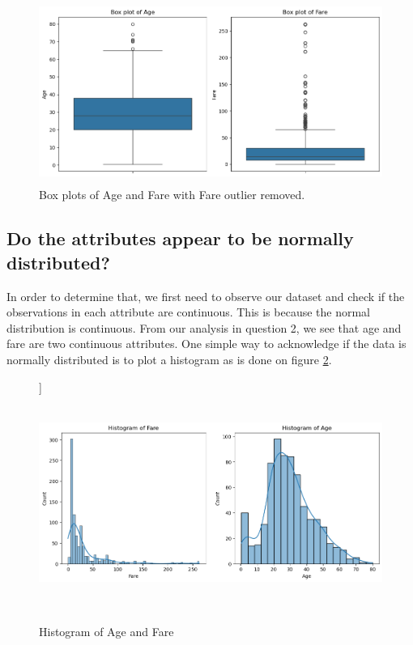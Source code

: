\documentclass[twoside,11pt]{article}
\begin{document}
\begin{figure}[h!]
	\centering
	\includegraphics[height=6cm]{analysis_files/analysis_3_0.png}
	\caption{Box plots of Age and Fare with Fare outlier removed.}
	\label{figure:final-box-plots}
\end{figure}

\subsection*{Do the attributes appear to be normally distributed?}

In order to determine that, we first need to observe our dataset and check if the observations in each attribute are continuous. This is because the normal distribution is continuous. From our analysis in question 2, we see that age and fare are two continuous attributes. One simple way to acknowledge if the data is normally distributed is to plot a histogram as is done on figure \ref{figure:histogram}.

\begin{figure}[h!]
	\centering]
	\includegraphics[height=7cm]{analysis_files/analysis_4_1.png}
	\caption{Histogram of Age and Fare}
	\label{figure:histogram}
\end{figure}
    
\end{document}
